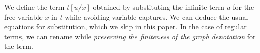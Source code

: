 
We define the term $t[u/x]$ obtained by substituting the infinite term $u$ for the 
free variable $x$ in $t$ while avoiding variable captures. We can deduce the
usual equations for substitution, which we skip in this paper. In the case of regular
terms, we can rename while \emph{preserving the finiteness of the graph 
denotation} for the term.

%

